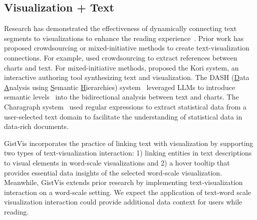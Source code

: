 \subsection{Visualization + Text}
\label{subsec:relatedwork-vistext}
Research has demonstrated the effectiveness of dynamically connecting text segments to visualizations to enhance the reading experience~\cite{latif2022kori, bromley2024dash, masson2023Charagraph}. Prior work has proposed crowdsourcing or mixed-initiative methods to create text-visualization connections. For example, \citet{kong2014extracting} used crowdsourcing to extract references between charts and text. For mixed-initiative methods, \citet{latif2022kori} proposed the Kori system, an interactive authoring tool synthesizing text and visualization. The DASH (\underline{D}ata \underline{A}nalysis using \underline{S}emantic \underline{H}ierarchies) system~\cite{bromley2024dash} leveraged LLMs to introduce semantic levels~\cite{lundgard2022accessible} into the bidirectional analysis between text and charts. The Charagraph system~\cite{masson2023Charagraph} used regular expressions to extract statistical data from a user-selected text domain to facilitate the understanding of statistical data in data-rich documents.

GistVis incorporates the practice of linking text with visualization by supporting two types of text-visualization interaction: 1) linking entities in text descriptions to visual elements in word-scale visualizations and 2) a hover tooltip that provides essential data insights of the selected word-scale visualization. Meanwhile, GistVis extends prior research by implementing text-visualization interaction on a word-scale setting. We expect the application of text-word scale visualization interaction could provide additional data context for users while reading. 
